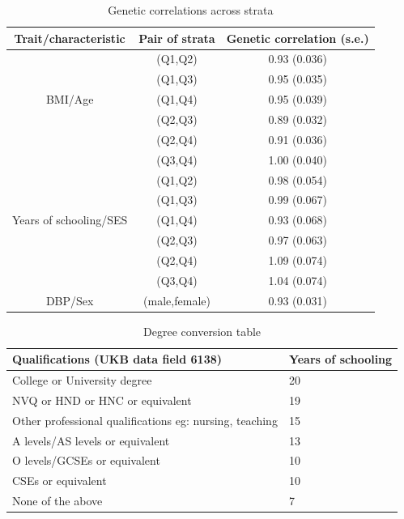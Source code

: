 \documentclass[hidelinks, 12pt]{article}
\begin{document}
\begin{table}[h!]
\caption{Genetic correlations across strata}
\begin{center}
 \begin{tabular}{|c | c | c |} 
 \hline
 \textbf{Trait/characteristic} & \textbf{Pair of strata} & \textbf{Genetic correlation (s.e.)} \\ [0.5ex] 
 \hline\hline
   & (Q1,Q2) & 0.93 (0.036)  \\ 
   & (Q1,Q3) & 0.95 (0.035)  \\ 
 BMI/Age & (Q1,Q4) & 0.95 (0.039)  \\ 
   & (Q2,Q3) & 0.89 (0.032)  \\ 
   & (Q2,Q4) & 0.91 (0.036)  \\ 
   & (Q3,Q4) & 1.00 (0.040)  \\ 
 \hline\hline
  & (Q1,Q2) & 0.98 (0.054)  \\ 
  & (Q1,Q3) & 0.99 (0.067)  \\ 
 Years of schooling/SES & (Q1,Q4) & 0.93 (0.068)  \\ 
  & (Q2,Q3) & 0.97 (0.063)  \\ 
  & (Q2,Q4) & 1.09 (0.074)  \\ 
  & (Q3,Q4) & 1.04 (0.074)  \\ 
 \hline\hline
 DBP/Sex & (male,female) & 0.93 (0.031)  \\ 
 \hline
 \end{tabular}
 \end{center}
\end{table}

\begin{table}[h!]
\caption{Degree conversion table}
\begin{center}
 \begin{tabular}{| l l |} 
 \hline
 \textbf{Qualifications (UKB data field 6138)} & \textbf{Years of schooling} \\ [0.5ex] 
 \hline\hline
  College or University degree  & 20  \\ 
  NVQ or HND or HNC or equivalent & 19  \\
  Other professional qualifications eg: nursing, teaching  & 15  \\
  A levels/AS levels or equivalent & 13  \\
  O levels/GCSEs or equivalent  & 10  \\
  CSEs or equivalent & 10  \\
  None of the above & 7  \\
   \hline
 \end{tabular}
\end{center}
\end{table}
\end{document}

